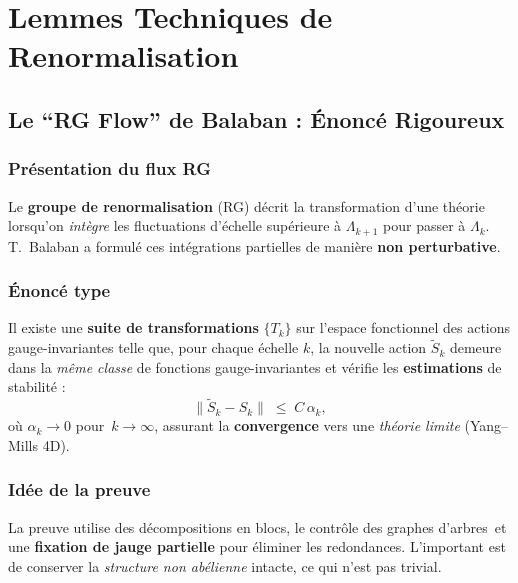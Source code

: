 \chapter{Lemmes Techniques de Renormalisation}
\label{ann:B}

\section{Le “RG Flow” de Balaban : Énoncé Rigoureux}
\label{sec:B.1}

\subsection*{Présentation du flux RG}
Le \textbf{groupe de renormalisation} (RG) décrit la transformation d’une théorie lorsqu’on \emph{intègre} les fluctuations d’échelle supérieure à \(\Lambda_{k+1}\) pour passer à \(\Lambda_k\). T.~Balaban \cite{Balaban1982-1,Balaban1982-2} a formulé ces intégrations partielles de manière \textbf{non perturbative}.

\subsection*{Énoncé type}
\begin{theorem}
	Il existe une \textbf{suite de transformations} \(\{T_k\}\) sur l’espace fonctionnel des actions gauge-invariantes telle que, pour chaque échelle \(k\), la nouvelle action \(\widetilde{S}_k\) demeure dans la \emph{même classe} de fonctions gauge-invariantes et vérifie les \textbf{estimations} de stabilité :
	\[
	\|\widetilde{S}_k - S_{k}\| \;\le\; C\,\alpha_k,
	\]
	où \(\alpha_k\to 0\) pour \(\,k\to \infty\), assurant la \textbf{convergence} vers une \emph{théorie limite} (Yang--Mills 4D).
\end{theorem}

\subsection*{Idée de la preuve}
La preuve utilise des décompositions en blocs, le contrôle des \og graphes d’arbres\fg\ et une \textbf{fixation de jauge partielle} pour éliminer les redondances. L’important est de conserver la \emph{structure non abélienne} intacte, ce qui n’est pas trivial.


